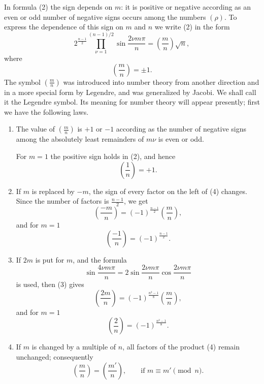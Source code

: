 \documentclass[11pt]{article}
\begin{document}
In formula (2) the sign depends on $m$: it is positive or negative according as an even or odd number of negative signs occurs among the numbers $(\rho)$. To express the dependence of this sign on $m$ and $n$ we write (2) in the form
\[
\tag{4}
2^{\frac{n-1}{2}}\prod_{\nu=1}^{(n-1)/2}
       \sin\frac{2\nu m\pi}{n}
   =\left(\frac mn\right)\sqrt n,
\]
where
\[
        \left(\frac mn\right)=\pm1.
\]
The symbol $\left(\frac mn\right)$ was introduced into number theory from another direction and in a more special form by Legendre, and was generalized by Jacobi. We shall call it the Legendre symbol. Its meaning for number theory will appear presently; first we have the following laws.

\begin{enumerate}[label=\arabic*.,leftmargin=2em]
\item The value of $\left(\frac mn\right)$ is $+1$ or $-1$ according as the number of negative signs among the absolutely least remainders of $m\nu$ is even or odd.

For $m=1$ the positive sign holds in (2), and hence
\[
        \left(\frac 1n\right)=+1.
\]

\item If $m$ is replaced by $-m$, the sign of every factor on the left of (4) changes. Since the number of factors is $\frac{n-1}{2}$, we get
\[
\tag{3'}
        \left(\frac{-m}{n}\right)=(-1)^{\frac{n-1}{2}}\left(\frac mn\right),
\]
and for $m=1$
\[
\tag{4'}
        \left(\frac{-1}{n}\right)=(-1)^{\frac{n-1}{2}}.
\]

\item If $2m$ is put for $m$, and the formula
\[
        \sin\frac{4\nu m\pi}{n}
        =2\sin\frac{2\nu m\pi}{n}\cos\frac{2\nu m\pi}{n}
\]
is used, then (3) gives
\[
\tag{5}
        \left(\frac{2m}{n}\right)=(-1)^{\frac{n^2-1}{8}}\left(\frac mn\right),
\]
and for $m=1$
\[
\tag{6}
        \left(\frac 2n\right)=(-1)^{\frac{n^2-1}{8}}.
\]

\item If $m$ is changed by a multiple of $n$, all factors of the product (4) remain unchanged; consequently
\[
\tag{7}
        \left(\frac mn\right)=\left(\frac {m'}n\right),
        \qquad\text{if }m\equiv m'\pmod n.
\]
\end{enumerate}
\end{document}
